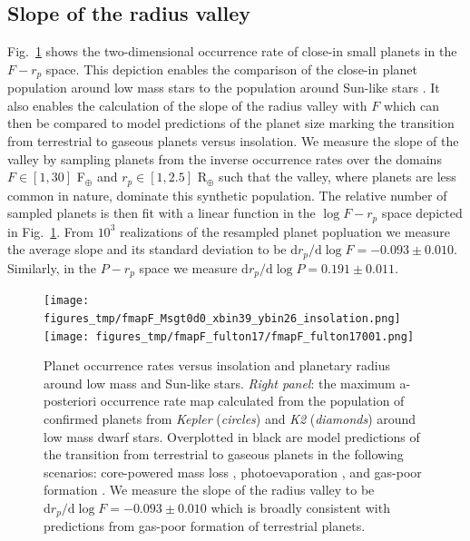 \documentclass[twocolumn]{emulateapj}
\newcommand{\kepler}[1]{\emph{Kepler}#1}
\newcommand{\ktwo}[1]{\emph{K2}#1}
\begin{document}
\subsection{Slope of the radius valley}
Fig.~\ref{fig:fmapF} shows the two-dimensional occurrence rate of
close-in small planets in the $F-r_p$ space. This depiction enables the comparison of the close-in
planet population around low mass stars to the population around Sun-like stars \citep{fulton17}.
It also enables the calculation of the slope of the radius valley with $F$ which can then be compared
to model predictions of the planet size marking the transition from terrestrial to gaseous planets
versus insolation. We measure the slope of the valley by sampling planets from the inverse occurrence
rates over the domains $F\in [1,30]$ F$_{\oplus}$ and $r_p\in [1,2.5]$ R$_{\oplus}$ such that the valley,
where planets are less common in nature, dominate this synthetic population. The relative number of
sampled planets is then fit with a linear function in the $\log{F}-r_p$ space depicted in
Fig.~\ref{fig:fmapF}. From $10^3$ realizations of the resampled planet popluation we
measure the average slope and its standard deviation to be
$\text{d}r_p / \text{d}\log{F} = -0.093\pm 0.010$. Similarly, in the $P-r_p$ space we measure
$\text{d}r_p / \text{d}\log{P} = 0.191\pm 0.011$.


\begin{figure}
  \centering
  \texttt{[image: figures\_tmp/fmapF\_Msgt0d0\_xbin39\_ybin26\_insolation.png]}
  \texttt{[image: figures\_tmp/fmapF\_fulton17/fmapF\_fulton17001.png]}
  \caption{Planet occurrence rates versus insolation and planetary radius around low mass and Sun-like stars.
    \emph{Right panel}: the maximum a-posteriori occurrence
    rate map calculated from the population of confirmed planets from \kepler{} (\emph{circles}) and
    \ktwo{} (\emph{diamonds}) around low mass dwarf
    stars. Overplotted in black are model predictions of the transition from terrestrial to gaseous
    planets in the following scenarios: core-powered mass loss \citep{gupta19b}, photoevaporation
    \citep{lopez18}, and gas-poor formation \cite{lopez18}. We measure the slope of the radius valley
    to be $\text{d}r_p / \text{d}\log{F} = -0.093\pm 0.010$ which is broadly consistent with predictions
    from gas-poor formation of terrestrial planets.} 
  \label{fig:fmapF}
\end{figure}
\end{document}
